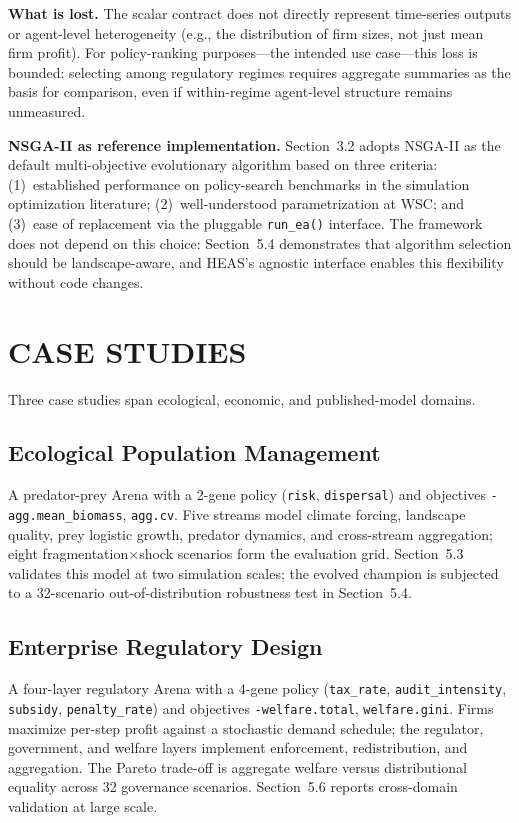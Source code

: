 \documentclass{wscpaperproc}
\begin{document}
\textbf{What is lost.} The scalar contract does not directly represent time-series
outputs or agent-level heterogeneity (e.g., the distribution of firm sizes, not
just mean firm profit). For policy-ranking purposes---the intended use case---this
loss is bounded: selecting among regulatory regimes requires aggregate summaries
as the basis for comparison, even if within-regime agent-level structure remains
unmeasured.

\textbf{NSGA-II as reference implementation.} Section~3.2 adopts NSGA-II as the
default multi-objective evolutionary algorithm based on three criteria:
(1)~established performance on policy-search benchmarks in the simulation
optimization literature; (2)~well-understood parametrization at WSC; and
(3)~ease of replacement via the pluggable \texttt{run\_ea()} interface. The
framework does not depend on this choice: Section~5.4 demonstrates that algorithm
selection should be landscape-aware, and HEAS's agnostic interface enables this
flexibility without code changes.

\section{CASE STUDIES}

Three case studies span ecological, economic, and published-model domains.

\subsection{Ecological Population Management}

A predator-prey Arena with a 2-gene policy (\texttt{risk},
\texttt{dispersal}) and objectives \texttt{-agg.mean\_biomass},
\texttt{agg.cv}. Five streams model climate forcing, landscape quality, prey
logistic growth, predator dynamics, and cross-stream aggregation; eight
fragmentation$\times$shock scenarios form the evaluation grid.
Section~5.3 validates this model at two simulation scales; the evolved champion
is subjected to a 32-scenario out-of-distribution robustness test in
Section~5.4.

\subsection{Enterprise Regulatory Design}

A four-layer regulatory Arena with a 4-gene policy
(\texttt{tax\_rate}, \texttt{audit\_intensity}, \texttt{subsidy},
\texttt{penalty\_rate}) and objectives \texttt{-welfare.total},
\texttt{welfare.gini}. Firms maximize per-step profit against a stochastic
demand schedule; the regulator, government, and welfare layers implement
enforcement, redistribution, and aggregation. The Pareto trade-off is
aggregate welfare versus distributional equality across 32 governance scenarios.
Section~5.6 reports cross-domain validation at large scale.
\end{document}
